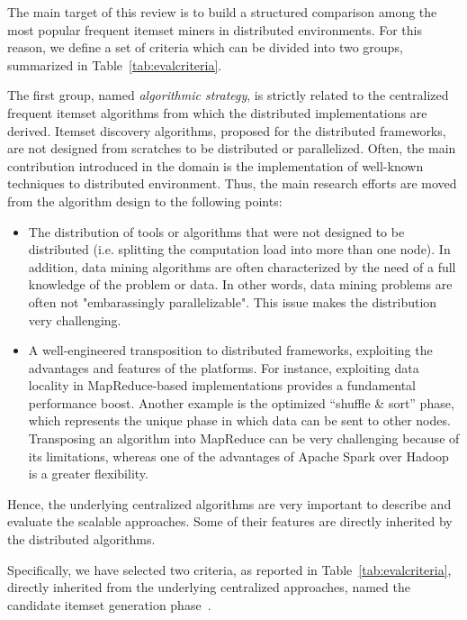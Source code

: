 The main target of this review is to build a structured comparison among the
most popular frequent itemset miners in distributed environments.
For this reason, we define a set of criteria
which can be divided into two groups, summarized in Table~\ref{tab:evalcriteria}.

The first group, named \textit{algorithmic strategy}, is strictly related to the centralized frequent itemset algorithms from which the distributed implementations are derived. 
Itemset discovery algorithms, proposed for the distributed frameworks, are not designed from scratches to be distributed or parallelized. Often, the main contribution introduced in the domain is the implementation of well-known techniques to distributed environment. Thus, the main research efforts are moved from the algorithm design to the following points:

\begin{itemize}

\item The distribution
of tools or algorithms that were not designed to be distributed (i.e. splitting
the computation load into more than one node). In addition, data mining
algorithms are often characterized by the need of a full knowledge of the
problem or data. In other words, data mining problems are often not
"embarassingly parallelizable". This issue makes the distribution very
challenging.

\item A well-engineered transposition to distributed frameworks,
exploiting the advantages and features of the platforms. For instance,
exploiting data locality in MapReduce-based implementations provides a
fundamental performance boost. Another example is the optimized ``shuffle \&
sort'' phase, which represents the unique phase in which data can be sent to other
nodes. Transposing an algorithm into MapReduce can be very challenging because
of its limitations, whereas one of the advantages of Apache Spark over Hadoop
is a  greater flexibility.

\end{itemize}

Hence, the underlying centralized algorithms
are very important to describe and evaluate the scalable approaches. Some of
their features are directly inherited by the distributed algorithms.

Specifically, we have selected two criteria, as reported in Table~\ref{tab:evalcriteria}, directly inherited from the underlying centralized approaches, named the candidate itemset generation phase~\cite{goethals2003survey}. 

